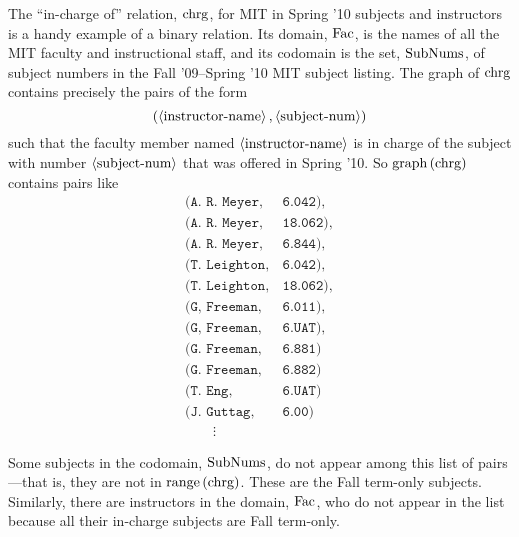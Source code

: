 The ``in-charge of'' relation, $\text{chrg}$, for MIT in Spring '10 subjects
and instructors is a handy example of a binary relation.  Its domain,
$\text{Fac}$, is the names of all the MIT faculty and instructional staff,
and its codomain is the set, $\text{SubNums}$, of subject numbers in the
Fall '09--Spring '10 MIT subject listing.  The graph of $\text{chrg}$ contains
precisely the pairs of the form
\[
(\left\langle\text{instructor-name}\right\rangle, \left\langle\text{subject-num}\right\rangle)
\]
such that the faculty member named $\left\langle\text{instructor-name}\right\rangle$ is in
charge of the subject with number $\left\langle\text{subject-num}\right\rangle$ that was
offered in Spring '10.  So $\mathop{\textup{graph}}\nolimits\left(\text{chrg}\right)$ contains pairs like
\[\begin{array}{ll}
(\texttt{A. R. Meyer}, & \texttt{6.042}),\\
(\texttt{A. R. Meyer}, & \texttt{18.062}),\\
(\texttt{A. R. Meyer}, & \texttt{6.844}),\\
(\texttt{T. Leighton}, & \texttt{6.042}),\\
(\texttt{T. Leighton}, & \texttt{18.062}),\\
(\texttt{G, Freeman}, & \texttt{6.011}),\\
(\texttt{G, Freeman}, & \texttt{6.UAT}),\\
(\texttt{G. Freeman}, & \texttt{6.881})\\
(\texttt{G. Freeman}, & \texttt{6.882})\\
(\texttt{T. Eng},      & \texttt{6.UAT})\\
(\texttt{J. Guttag},  & \texttt{6.00})\\
\qquad \vdots
\end{array}\]

\iffalse
This is a surprisingly complicated relation: Meyer is in charge of
subjects with three numbers.  Leighton is also in charge of subjects with
two of these three numbers ---because the same subject, Mathematics for
Computer Science, has two numbers: 6.042 and 18.062, and Meyer and
Leighton are co-in-charge of the subject.  Freeman is in-charge of even
more subjects numbers (around 20), since as Department Education Officer,
he is in charge of whole blocks of special subject numbers.  Some
subjects, like 6.844 and 6.00 have only one person in-charge.  Some
faculty, like Guttag, are in charge of only one subject number, and no one
else is co-in-charge of his subject, 6.00.
\fi

Some subjects in the codomain, $\text{SubNums}$, do not appear among this list
of pairs---that is, they are not in $\mathop{\textup{range}}\nolimits\left(\text{chrg}\right)$.  These are the Fall
term-only subjects.  Similarly, there are instructors in the domain,
$\text{Fac}$, who do not appear in the list because all their in-charge
subjects are Fall term-only.

